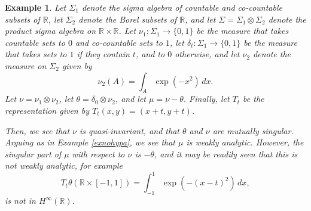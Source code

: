 \documentclass[12pt]{article}
\newcommand{\R}{\mathbb R}
\newtheorem{ex}[defin]{Example}
\begin{document}
\begin{ex}
{\rm Let $\Sigma_1$ denote the sigma algebra of countable
and co-countable subsets of $\R$, let $\Sigma_2$ denote
the Borel subsets of $\R$, and let $\Sigma = \Sigma_1 \otimes
\Sigma_2$ denote the product sigma algebra on $\R \times \R$.
Let $\nu_1:\Sigma_1 \to \{0,1\}$ be the measure that takes countable sets
to $0$ and co-countable sets to $1$, let $\delta_t:\Sigma_1\to\{0,1\}$
be the measure that takes sets to $1$ if they contain $t$, and to $0$ otherwise,
and let $\nu_2$ denote the measure on $\Sigma_2$ given by
$$ \nu_2(A) = \int_A \exp(-x^2) \, dx .$$
Let $\nu = \nu_1\otimes \nu_2$, 
let $\theta = \delta_0\otimes\nu_2$, and
let $\mu = \nu-\theta$.
Finally, let $T_t$ be the representation given by 
$T_t(x,y) = (x+t,y+t)$.

Then, we see that $\nu$ is quasi-invariant, and that
$\theta$ and $\nu$ are mutually singular.
Arguing as in
Example \ref{exnohypa}, we see that $\mu$ is weakly analytic.
However, the singular part of $\mu$ with respect to $\nu$
is $-\theta$, and it may be readily seen that this is
not weakly analytic, for example
$$ T_t\theta(\R\times[-1,1])
   = \int_{-1}^1 \exp(-(x-t)^2) \, dx ,$$
is not in $H^\infty(\R)$.}
\end{ex}

\
\end{document}
